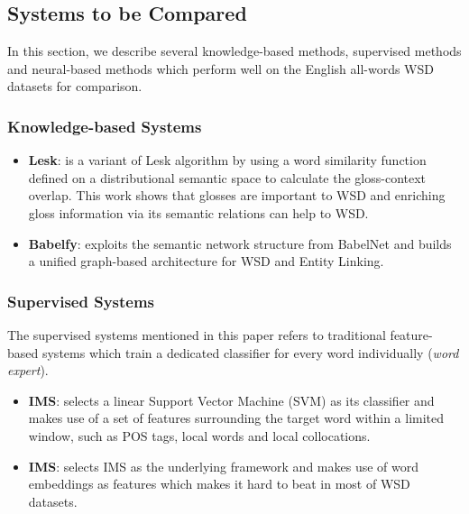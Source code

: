 \documentclass[11pt,a4paper]{article}
\begin{document}
\subsection{Systems to be Compared}
In this section, we describe several knowledge-based methods, supervised methods and neural-based methods which perform well on the English all-words WSD datasets for comparison.

\subsubsection{Knowledge-based Systems}
\begin{itemize}
\item \textbf{Lesk}: \citet{Basile2014LeskExt} is a variant of Lesk algorithm \cite{Lesk1986Lesk} by using a word similarity function defined on a distributional semantic space to calculate the gloss-context overlap. This work shows that glosses are important to WSD and enriching gloss information via its semantic relations can help to WSD.
  \item \textbf{Babelfy}: \citet{Moro2014Babelfy} exploits the semantic network structure from BabelNet and builds a unified graph-based architecture for WSD and Entity Linking.
\end{itemize}

\subsubsection{Supervised Systems}
The supervised systems mentioned in this paper refers to traditional feature-based systems which train a dedicated classifier for every word individually ({\em word expert}).
\begin{itemize}
  \item \textbf{IMS}: \citet{Zhong2010IMS} selects a linear Support Vector Machine (SVM) as its classifier and makes use of a set of features surrounding the target word within a limited window, such as POS tags, local words and local collocations.
  \item \textbf{IMS}: \citet{Iacobacci2016} selects IMS as the underlying framework and makes use of word embeddings as features which makes it hard to beat in most of WSD datasets.
\end{itemize}
\end{document}
